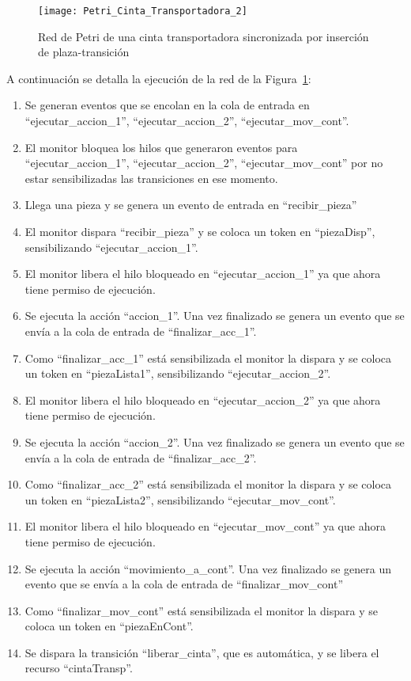 \begin{figure}[H]
    \centering
    \texttt{[image: Petri\_Cinta\_Transportadora\_2]}
    \caption{Red de Petri de una cinta transportadora sincronizada por inserción
    de plaza-transición}
    \label{fig:petri_cinta_transportadora_2}
\end{figure}


A continuación se detalla la ejecución de la red de la
Figura~\ref{fig:petri_cinta_transportadora_2}:\\
\begin{enumerate}
	\item Se generan eventos que se encolan en la cola de entrada en
	``ejecutar\_accion\_1'', ``ejecutar\_accion\_2'', ``ejecutar\_mov\_cont''.
	\item El monitor bloquea los hilos que generaron eventos para
	``ejecutar\_accion\_1'', ``ejecutar\_accion\_2'', ``ejecutar\_mov\_cont''
	por no estar sensibilizadas las transiciones en ese momento.
	\item Llega una pieza y se genera un evento de entrada en “recibir\_pieza”
	\item El monitor dispara “recibir\_pieza” y se coloca un token en “piezaDisp”,
		sensibilizando “ejecutar\_accion\_1”.
	\item El monitor libera el hilo bloqueado en “ejecutar\_accion\_1” ya que ahora tiene permiso
		de ejecución.
	\item Se ejecuta la acción “accion\_1”. Una vez finalizado se genera un evento
	que se envía a la cola de entrada de “finalizar\_acc\_1”.
	\item Como “finalizar\_acc\_1” está sensibilizada el monitor la dispara y se coloca un token
		en “piezaLista1”, sensibilizando “ejecutar\_accion\_2”.
	\item El monitor libera el hilo bloqueado en “ejecutar\_accion\_2” ya que ahora
	tiene permiso de ejecución.
	\item Se ejecuta la acción “accion\_2”. Una vez finalizado se genera un evento
	que se envía a la cola de entrada de “finalizar\_acc\_2”.
	\item Como “finalizar\_acc\_2” está sensibilizada el monitor la dispara y se
	coloca un token en “piezaLista2”, sensibilizando “ejecutar\_mov\_cont”.
	\item El monitor libera el hilo bloqueado en “ejecutar\_mov\_cont” ya que ahora tiene permiso
		de ejecución.
	\item Se ejecuta la acción “movimiento\_a\_cont”. Una vez finalizado se genera
	un evento que se envía a la cola de entrada de “finalizar\_mov\_cont”
	\item Como “finalizar\_mov\_cont” está sensibilizada el monitor la dispara y se coloca un token
		en ``piezaEnCont''.
	\item Se dispara la transición ``liberar\_cinta'', que es automática, y se
	libera el recurso ``cintaTransp''.
\end{enumerate}

